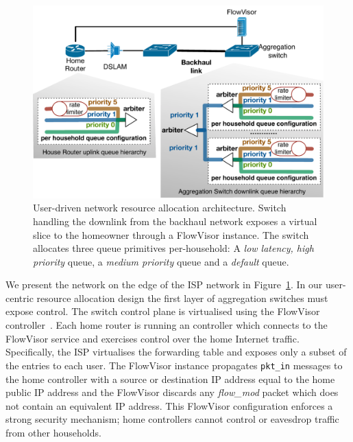 \begin{figure}
  \centering
  \includegraphics[width=0.7\columnwidth]{queue_design}
  \caption{User-driven network resource allocation architecture. 
    \label{fig:queue_design} Switch handling the downlink from the backhaul
    network exposes a
    virtual slice to the homeowner through a FlowVisor instance.  The switch
    allocates three queue primitives per-household: A {\it low latency,
      high priority} \/queue, a {\it medium priority} \/queue and a {\it default}
    \/queue.}
\end{figure}

We present the network on the edge of the ISP network in
Figure~\ref{fig:queue_design}.  In our user-centric resource allocation design
the first layer of aggregation switches must expose \of control.  The switch
control plane is virtualised using the FlowVisor
controller~\cite{flowvisor-osdi}. Each home router is running an \of controller
which connects to the FlowVisor service and exercises control over the home
Internet traffic. Specifically, the ISP virtualises the \of forwarding table and
exposes only a subset of the entries to each user.  The FlowVisor instance
propagates {\tt pkt\_in} messages to the home controller with a source or
destination IP address equal to the home public IP address and the FlowVisor
discards any {\it flow\_mod} packet which does not contain an equivalent IP
address. This FlowVisor configuration enforces a strong security mechanism; home
controllers cannot control or eavesdrop traffic from other households. 

